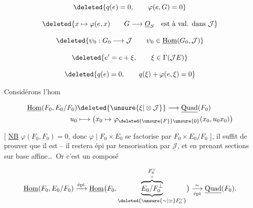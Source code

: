 

\[
 \deleted{q(e)=0,\qquad\varphi(e,G)=0}
\]


\[
 \deleted{x\mapsto\varphi(e,x)\qquad G\longrightarrow\underline O_S\quad\text{est à val. dans }\mathcal J}
\]


\[
 \deleted{\psi_0:G_0\longrightarrow\mathcal J\qquad\psi_0\in\underline{\mathrm{Hom}}(G_0,\mathcal J)}
\]


\[
 \deleted{e'=e+\xi,\qquad\xi\in\Gamma(\mathcal J E)}
\]


\[
 \deleted{q(e)=0,\qquad q(\xi)+\varphi(e,\xi)=0}
\]


Considérons l'hom

\[
 \begin{aligned}
 \underline{\mathrm{Hom}}(F_0,E_0/F_0)&\deleted{\unsure{\xi|\otimes\mathcal J}}\longrightarrow\underline{\mathrm{Quad}}(F_0)\\
 u_0&\longmapsto\bigl(x_0\mapsto\varphi_{\deleted{\unsure{F}}\unsure{0}}(x_0,u_0x_0)\bigr)
 \end{aligned}
\]

[ \uline{NB} $\varphi(F_0,F_0)=0$, donc $\varphi\mid F_0\times E_0$ se factorise par $F_0\times E_0/F_0$ ], il suffit de prouver que il est  -- il restera épi par tensorisation par $\underline{\mathcal J}$, et en prenant sections sur base affine\ldots\ Or c'est un composé

\[
 \underline{\mathrm{Hom}}(F_0,E_0/F_0)\xrightarrow{\text{épi}}
 \underline{\mathrm{Hom}}\bigl(F_0,
 \underbrace{\overbrace{E_0/F_0^\perp}^{\substack{F_0^\vee\\\shortparallel}}}_{\deleted{\unsure{\sim|\simeq}F_0^\vee}}\bigr)
 \underset{\text{épi}}{\overset{\sim}{\longrightarrow}}\underline{\mathrm{Quad}}(F_0).
\]

 


